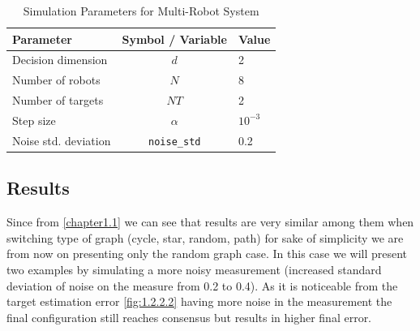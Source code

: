 \documentclass[a4paper,11pt,oneside]{book}
\begin{document}
\begin{table}[H]
    \centering
    \renewcommand{\arraystretch}{1.3} %
    \caption{Simulation Parameters for Multi-Robot System}
    \label{tab:simulation_parameters}
    \begin{tabular}{|l|c|l|}
        \hline
        \textbf{Parameter} & \textbf{Symbol / Variable} & \textbf{Value} \\ \hline
        Decision dimension & $d$ & 2 \\ \hline
        Number of robots & $N$ & 8 \\ \hline
        Number of targets & $NT$ & 2 \\ \hline
        Step size & $\alpha$ & $10^{-3}$ \\ \hline
        Noise std. deviation & \texttt{noise\_std} & 0.2\\ \hline
    \end{tabular}
\end{table}

\subsection{Results}
Since from \autoref{chapter1.1} we can see that results are very similar among them when switching type of graph (cycle, star, random, path) for sake of simplicity we are from now on presenting only the random graph case.
In this case we will present two examples by simulating a more noisy measurement (increased standard deviation of noise on the measure from 0.2 to 0.4).
As it is noticeable from the target estimation error \autoref{fig:1.2.2.2} having more noise in the measurement the final configuration still reaches consensus but results in higher final error.

\end{document}
